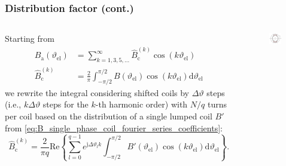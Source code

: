 \begin{frame}
	\frametitle{Distribution factor  (cont.)}
    \begin{columns}
		\begin{column}{0.6\textwidth}
	        Starting from
            \begin{align*}
                B_\mathrm{a}(\vartheta_\mathrm{el}) &= \sum_{k=1,3,5,\ldots}^{\infty} \hat{B}_{\mathrm{c}}^{(k)} \cos(k \vartheta_\mathrm{el})\\ \hat{B}_{\mathrm{c}}^{(k)} &= \frac{2}{\pi} \int_{-\pi/2}^{\pi/2} B(\vartheta_\mathrm{el}) \cos(k \vartheta_\mathrm{el}) \mathrm{d}\vartheta_\mathrm{el}
            \end{align*}
            we rewrite the integral considering shifted coils by $\Delta \vartheta$ steps (i.e., $k \Delta \vartheta$ steps for the $k$-th harmonic order) with $N/q$ turns per coil based on the distribution of a single lumped coil $B'$ from \eqref{eq:B_single_phase_coil_fourier_series_coefficients}:
            \begin{equation*}
                \hat{B}_{\mathrm{c}}^{(k)} = \frac{2}{\pi q} \mathrm{Re}\left\{\sum_{l=0}^{q-1}e^{\mathrm{j} \Delta\vartheta_l k}\int_{-\pi/2}^{\pi/2} B'(\vartheta_\mathrm{el}) \cos(k \vartheta_\mathrm{el}) \mathrm{d}\vartheta_\mathrm{el}\right\}.
            \end{equation*}
        \end{column}
        \begin{column}{0.4\textwidth}
            \begin{figure}
                \centering
                \includegraphics[width=0.9\textwidth]{fig/lec05/MMF_single_phase_distributed.pdf}

\end{figure}
\end{column}
\end{columns}
\end{frame}
